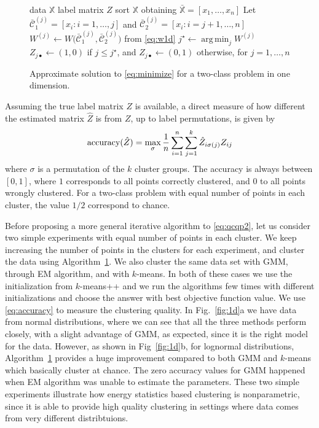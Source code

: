 \documentclass[aps,preprint,nofootinbib,floatfix]{revtex4-1}
\DeclareMathOperator*{\argmin}{arg\,min}
\newcommand\C{{\mathcal{C}}}
\begin{document}
\begin{figure}
\begin{algorithm}[H]\vspace{.5em}
\begin{algorithmic}[1]
\INPUT data $\mathbb{X}$
\OUTPUT label matrix $Z$
\STATE sort $\mathbb{X}$ obtaining 
$\bar{\mathbb{X}}= [ x_1,\dotsc,x_n ]$
        \STATE Let $\bar{\C}_1^{(j)} = [x_i: i=1,\dotsc,j]$ and 
                $\bar{\C}_2^{(j)} = [x_i : i=j+1,\dotsc,n]$
        \STATE  
            $W^{(j)} \leftarrow W \big( \bar{\C}_1^{(j)},\bar{\C}_2^{(j)}  
            \big)$ from \eqref{eq:w1d}
    \ENDFOR
    \STATE $j^\star \leftarrow \argmin_j W^{(j)}$ 
    \STATE $Z_{j\bullet} \leftarrow (1,0) $ if $j\le j^\star$, and
           $Z_{j\bullet} \leftarrow (0,1)$ otherwise, for $j=1,\dotsc,n$
\end{algorithmic}
\caption{
\label{algo1d}
Approximate solution to \eqref{eq:minimize} 
for a two-class problem in one dimension. \hspace{\fill}
}
\end{algorithm}
\end{figure}

Assuming the true label matrix $Z$ is available, a direct
measure of how different the estimated matrix $\hat{Z}$ 
is from $Z$, up to label
permutations, is given by
\begin{equation}
\label{eq:accuracy}
\textnormal{accuracy}(\hat{Z}) = \max_\sigma 
\dfrac{1}{n}\sum_{i=1}^n\sum_{j=1}^k \hat{Z}_{i \sigma(j)} Z_{ij}
\end{equation}
where $\sigma$ is a permutation
of the $k$ cluster groups. 
The accuracy is always between $[0,1]$, where
$1$ corresponds to all points correctly clustered, and 
$0$ to all points wrongly clustered.
For a two-class problem with equal
number of points in each cluster, the value $1/2$ correspond
to chance.

Before proposing a more general iterative algorithm to \eqref{eq:qcqp2},
let us consider two simple experiments with equal number of points
in each cluster. 
We keep increasing the number of points in the clusters for each experiment, 
and cluster the data using Algorithm~\ref{algo1d}. 
We also cluster the same data set
with GMM, through EM algorithm, and with $k$-means. In both of these
cases we use the initialization from $k$-means++ \cite{Vassilvitskii} 
and we run the algorithms
few times with different initializations and choose the answer
with best objective function value. We use \eqref{eq:accuracy} to measure
the clustering quality. 
In  Fig.~\ref{fig:1d}a 
we have data from normal distributions,
where we can see that all the three methods
perform closely, with a slight advantage of GMM, as expected, since
it is the right model for the data. However, as shown in Fig~\ref{fig:1d}b,
for lognormal distributions, Algorithm~\ref{algo1d} provides a huge improvement
compared to both GMM and $k$-means which basically cluster at chance.
The zero accuracy values for GMM happened when EM algorithm was unable
to estimate the parameters. These two simple experiments illustrate
how energy statistics based clustering is nonparametric, since it is able
to provide high quality clustering in settings where data comes
from very different distribtuions.
\end{document}
